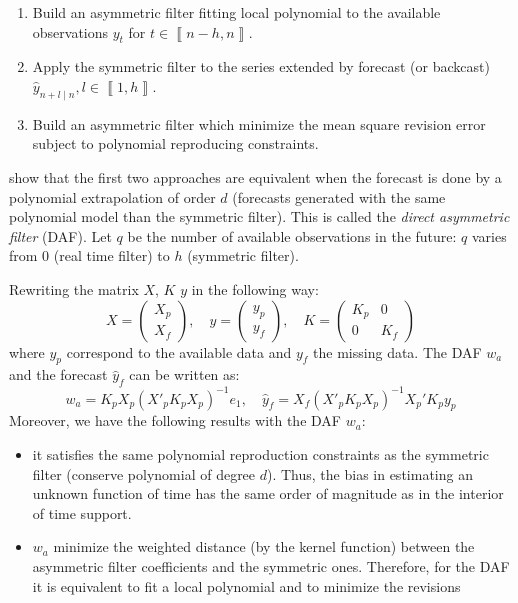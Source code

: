 \documentclass[
  12pt,
  ,
  a4paper]{article}
\newcommand\1{\mathds{1}}
\begin{document}
\begin{enumerate}
\def\labelenumi{\arabic{enumi}.}
\item
  Build an asymmetric filter fitting local polynomial to the available observations \(y_{t}\) for \(t\in\left\llbracket n-h,n\right\rrbracket\).
\item
  Apply the symmetric filter to the series extended by forecast (or backcast) \(\hat{y}_{n+l\mid n},l\in\left\llbracket 1,h\right\rrbracket\).
\item
  Build an asymmetric filter which minimize the mean square revision error subject to polynomial reproducing constraints.
\end{enumerate}

\textcite{proietti2008} show that the first two approaches are equivalent when the forecast is done by a polynomial extrapolation of order \(d\) (forecasts generated with the same polynomial model than the symmetric filter).
This is called the \emph{direct asymmetric filter} (DAF).
Let \(q\) be the number of available observations in the future: \(q\) varies from 0 (real time filter) to \(h\) (symmetric filter).

Rewriting the matrix \(X\), \(K\) \(y\) in the following way:
\[
X=\begin{pmatrix}X_{p}\\
X_{f}
\end{pmatrix},\quad y=\begin{pmatrix}y_{p}\\
y_{f}
\end{pmatrix},\quad K=\begin{pmatrix}K_{p} & 0\\
0 & K_{f}
\end{pmatrix}
\]
where \(y_{p}\) correspond to the available data and \(y_{f}\) the missing data.
The DAF \(w_a\) and the forecast \(\hat{y}_{f}\) can be written as:
\[
w_{a}=K_{p}X_{p}(X'_{p}K_{p}X_{p})^{-1}e_{1},
\quad
\hat{y}_{f}=X_{f}(X'_{p}K_{p}X_{p})^{-1}X_{p}'K_{p}y_{p}
\]
Moreover, we have the following results with the DAF \(w_a\):

\begin{itemize}
\item
  it satisfies the same polynomial reproduction constraints as the symmetric filter (conserve polynomial of degree \(d\)).
  Thus, the bias in estimating an unknown function of time has the same order of magnitude as in the interior of time support.
\item
  \(w_a\) minimize the weighted distance (by the kernel function) between the asymmetric filter coefficients and the symmetric ones.
  Therefore, for the DAF it is equivalent to fit a local polynomial and to minimize the revisions
\end{itemize}
\end{document}
